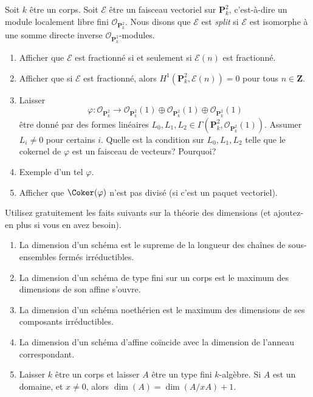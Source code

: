\begin{exercise}
\label{exercise-nonsplit-vectorbundle}
Soit $k$ être
un corps. Soit $\mathcal{E}$ être un faisceau vectoriel sur $\mathbf{P}^2_k$,
c'est-à-dire un module localement libre fini
$\mathcal{O}_{\mathbf{P}^2_k}$. Nous disons que $\mathcal{E}$ est {\it split} si
$\mathcal{E}$ est isomorphe à une somme directe inverse $\mathcal{O}_{\mathbf{P}^2_k}$-modules.
\begin{enumerate}
\item Afficher que $\mathcal{E}$ est fractionné si et seulement si $\mathcal{E}(n)$ est
fractionné.
\item Afficher que si $\mathcal{E}$ est fractionné,
alors $H^1({\mathbf{P}^2_k}, \mathcal{E}(n)) = 0$ pour
tous $n \in \mathbf{Z}$.
\item Laisser
$$
\varphi :
\mathcal{O}_{\mathbf{P}^2_k}
\longrightarrow
\mathcal{O}_{\mathbf{P}^2_k}(1) \oplus
\mathcal{O}_{\mathbf{P}^2_k}(1) \oplus
\mathcal{O}_{\mathbf{P}^2_k}(1)
$$
être donné par des
formes linéaires $L_0, L_1, L_2 \in \Gamma(\mathbf{P}^2_k, \mathcal{O}_{\mathbf{P}^2_k}(1))$. Assumer $L_i \not = 0$
pour certains $i$. Quelle est la
condition sur $L_0, L_1, L_2$ telle que le cokernel
de $\varphi$ est un faisceau de vecteurs?
Pourquoi?
\item Exemple d'un tel $\varphi$.
\item Afficher que $\Coker(\varphi)$ n'est pas divisé (si c'est
un paquet vectoriel).
\end{enumerate}
\end{exercise}

\begin{remark}
\label{remark-recall-dimension-theory}
Utilisez gratuitement les faits suivants sur la théorie des dimensions (et
ajoutez-en plus si vous en avez besoin).
\begin{enumerate}
\item La dimension d'un schéma est le supreme de la longueur des
chaînes de sous-ensembles fermés irréductibles.
\item La dimension d'un schéma de type fini sur un corps est le
maximum des dimensions de son affine s'ouvre.
\item La dimension d'un schéma noethérien est le maximum des dimensions
de ses composants irréductibles.
\item La dimension d'un schéma
d'affine coïncide avec la dimension de l'anneau correspondant.
\item Laisser $k$ être un corps et laisser $A$ être un type fini $k$-algèbre. Si
$A$ est un domaine, et $x \not = 0$, alors $\dim(A) = \dim(A/xA) + 1$.
\end{enumerate}
\end{remark}

